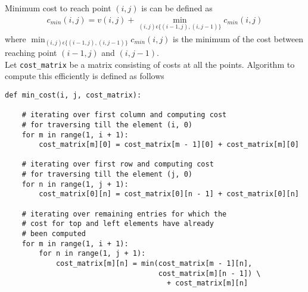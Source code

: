 \documentclass[12pt]{article}
\begin{document}
\begin{enumerate}[label=(\alph*)]
Minimum cost to reach point $(i, j)$ is can be defined as \\
\begin{align*}
c_{min}(i, j) = v(i, j) + \min_{(i, j) \epsilon \{(i-1, j), (i, j-1)\}}c_{min}(i, j)
\end{align*}
where $\min_{(i, j) \epsilon \{(i-1, j), (i, j-1)\}}c_{min}(i, j)$ is the minimum of the cost between reaching point $(i-1, j)$ and $(i, j-1)$. \\
Let \lstinline{cost_matrix} be a matrix consisting of costs at all the points. Algorithm to compute this efficiently is defined as follows\\
\begin{lstlisting}[basicstyle=\small]
def min_cost(i, j, cost_matrix):

    # iterating over first column and computing cost
    # for traversing till the element (i, 0)
    for m in range(1, i + 1):
        cost_matrix[m][0] = cost_matrix[m - 1][0] + cost_matrix[m][0]

    # iterating over first row and computing cost
    # for traversing till the element (j, 0)
    for n in range(1, j + 1):
        cost_matrix[0][n] = cost_matrix[0][n - 1] + cost_matrix[0][n]

    # iterating over remaining entries for which the
    # cost for top and left elements have already
    # been computed
    for m in range(1, i + 1):
        for n in range(1, j + 1):
            cost_matrix[m][n] = min(cost_matrix[m - 1][n],
                                    cost_matrix[m][n - 1]) \
                                      + cost_matrix[m][n]


\end{lstlisting}
\end{enumerate}
\end{document}
